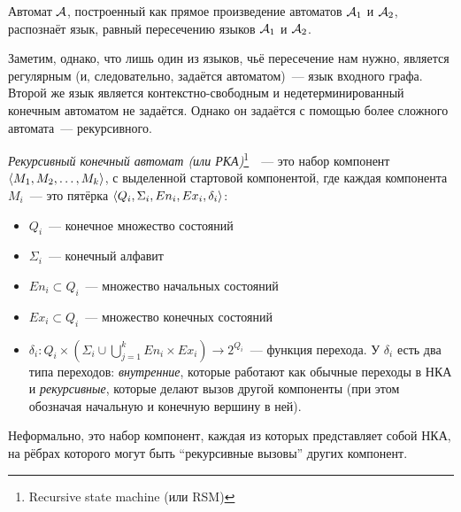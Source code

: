 \begin{proposition}\label{prop:reg_inter} \cite{Hopcroft1979}
  Автомат $\mathcal{A}$, построенный как прямое произведение автоматов $\mathcal{A}_1$ и $\mathcal{A}_2$, распознаёт язык, равный пересечению языков $\mathcal{A}_1$ и $\mathcal{A}_2$.
\end{proposition}

Заметим, однако, что лишь один из языков, чьё пересечение нам нужно, является регулярным (и, следовательно, задаётся автоматом)~--- язык входного графа. Второй же язык является контекстно-свободным и недетерминированный конечным автоматом не задаётся. Однако он задаётся с помощью более сложного автомата~--- рекурсивного. 

\begin{definition}
  \textit{Рекурсивный конечный автомат (или РКА)}\footnote{Recursive state machine (или RSM)}~\cite{Alur05}~--- это набор компонент $\langle M_1, M_2, \dots, M_k \rangle$, с выделенной стартовой компонентой, где каждая компонента $M_i$~--- это пятёрка $\langle Q_i, \Sigma_i, En_i, Ex_i, \delta_i \rangle$:
      \vspace{-\topsep}
      \begin{itemize}
        \setlength\itemsep{-0.1em}
        \item $Q_i$~--- конечное множество состояний
        \item $\Sigma_i$~--- конечный алфавит
        \item $En_i \subset Q_i$~--- множество начальных состояний
        \item $Ex_i \subset Q_i$~--- множество конечных состояний
        \item $\delta_i \colon Q_i \times (\Sigma_i \cup \bigcup\limits_{j = 1}^k En_i \times Ex_i ) \to 2^{Q_i}$~--- функция перехода. У $\delta_i$ есть два типа переходов: \textit{внутренние}, которые работают как обычные переходы в НКА и \textit{рекурсивные}, которые делают вызов другой компоненты (при этом обозначая начальную и конечную вершину в ней).
      \end{itemize}

  Неформально, это набор компонент, каждая из которых представляет собой НКА, на рёбрах которого могут быть ``рекурсивные вызовы'' других компонент.

\end{definition}

